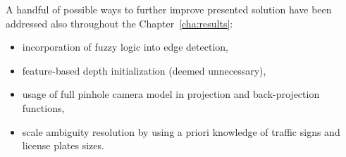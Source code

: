 
A handful of possible ways to further improve presented solution have been addressed also throughout the Chapter~\ref{cha:results}:
\begin{itemize}[topsep=0.5em]
	\itemsep-0.25em
	\item incorporation of fuzzy logic into edge detection,
	\item feature-based depth initialization (deemed unnecessary),
	\item usage of full pinhole camera model in projection and back-projection functions,
	\item scale ambiguity resolution by using a priori knowledge of traffic signs and license plates sizes.
\end{itemize}

